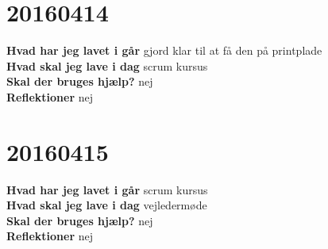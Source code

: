 \documentclass{article}
\begin{document}
	\section{20160414}
	
	\textbf{Hvad har jeg lavet i går}
	gjord klar til at få den på printplade
	\\
	\textbf{Hvad skal jeg lave i dag}
scrum kursus
	\\
	\textbf{Skal der bruges hjælp?}
	nej
	\\
	\textbf{Reflektioner}
	nej
\section{20160415}
	
\textbf{Hvad har jeg lavet i går}
scrum kursus
\\
\textbf{Hvad skal jeg lave i dag}
vejledermøde
\\
\textbf{Skal der bruges hjælp?}
nej
\\
\textbf{Reflektioner}
nej						
\end{document}

